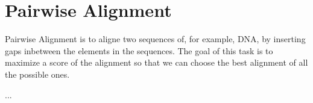 \section{Pairwise Alignment}
Pairwise Alignment is to aligne two sequences of, for example, DNA, by inserting gaps inbetween the elements in the sequences.  The goal of this task is to maximize a score of the alignment so that we can choose the best alignment of all the possible ones.

...
